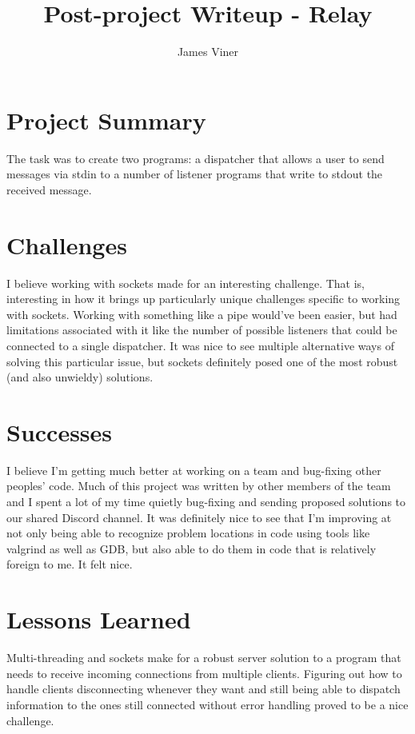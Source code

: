 \documentclass[11pt]{report}
\begin{document}
\title{Post-project Writeup - Relay}
\author{James Viner}
\date{} %

\maketitle

\doublespacing

\section*{Project Summary}
The task was to create two programs: a dispatcher that allows a user to send messages via stdin to a number of listener programs that write to stdout the received message.
\section*{Challenges}
I believe working with sockets made for an interesting challenge. That is, interesting in how it brings up particularly unique challenges specific to working with sockets. Working with something like a pipe would've been easier, but had limitations associated with it like the number of possible listeners that could be connected to a single dispatcher. It was nice to see multiple alternative ways of solving this particular issue, but sockets definitely posed one of the most robust (and also unwieldy) solutions.
\pagebreak
\section*{Successes}
I believe I'm getting much better at working on a team and bug-fixing other peoples' code. Much of this project was written by other members of the team and I spent a lot of my time quietly bug-fixing and sending proposed solutions to our shared Discord channel. It was definitely nice to see that I'm improving at not only being able to recognize problem locations in code using tools like valgrind as well as GDB, but also able to do them in code that is relatively foreign to me. It felt nice.
\section*{Lessons Learned}
Multi-threading and sockets make for a robust server solution to a program that needs to receive incoming connections from multiple clients. Figuring out how to handle clients disconnecting whenever they want and still being able to dispatch information to the ones still connected without error handling proved to be a nice challenge.
\end{document}
